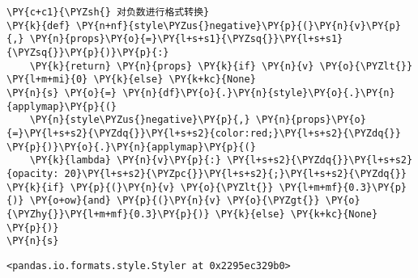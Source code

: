     \begin{tcolorbox}[breakable, size=fbox, boxrule=1pt, pad at break*=1mm,colback=cellbackground, colframe=cellborder]
\begin{Verbatim}[commandchars=\\\{\}]
\PY{c+c1}{\PYZsh{} 对负数进行格式转换}
\PY{k}{def} \PY{n+nf}{style\PYZus{}negative}\PY{p}{(}\PY{n}{v}\PY{p}{,} \PY{n}{props}\PY{o}{=}\PY{l+s+s1}{\PYZsq{}}\PY{l+s+s1}{\PYZsq{}}\PY{p}{)}\PY{p}{:}
    \PY{k}{return} \PY{n}{props} \PY{k}{if} \PY{n}{v} \PY{o}{\PYZlt{}} \PY{l+m+mi}{0} \PY{k}{else} \PY{k+kc}{None}
\PY{n}{s} \PY{o}{=} \PY{n}{df}\PY{o}{.}\PY{n}{style}\PY{o}{.}\PY{n}{applymap}\PY{p}{(}
    \PY{n}{style\PYZus{}negative}\PY{p}{,} \PY{n}{props}\PY{o}{=}\PY{l+s+s2}{\PYZdq{}}\PY{l+s+s2}{color:red;}\PY{l+s+s2}{\PYZdq{}}
\PY{p}{)}\PY{o}{.}\PY{n}{applymap}\PY{p}{(}
    \PY{k}{lambda} \PY{n}{v}\PY{p}{:} \PY{l+s+s2}{\PYZdq{}}\PY{l+s+s2}{opacity: 20}\PY{l+s+s2}{\PYZpc{}}\PY{l+s+s2}{;}\PY{l+s+s2}{\PYZdq{}} \PY{k}{if} \PY{p}{(}\PY{n}{v} \PY{o}{\PYZlt{}} \PY{l+m+mf}{0.3}\PY{p}{)} \PY{o+ow}{and} \PY{p}{(}\PY{n}{v} \PY{o}{\PYZgt{}} \PY{o}{\PYZhy{}}\PY{l+m+mf}{0.3}\PY{p}{)} \PY{k}{else} \PY{k+kc}{None}
\PY{p}{)}
\PY{n}{s}
\end{Verbatim}
\end{tcolorbox}

            \begin{tcolorbox}[breakable, size=fbox, boxrule=.5pt, pad at break*=1mm, opacityfill=0]
\begin{Verbatim}[commandchars=\\\{\}]
<pandas.io.formats.style.Styler at 0x2295ec329b0>
\end{Verbatim}
\end{tcolorbox}

